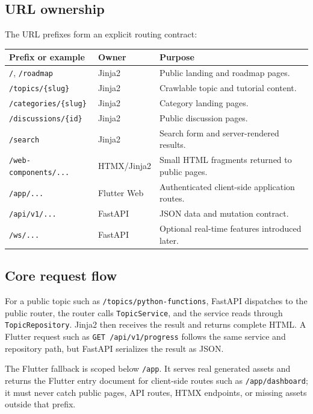 \documentclass[11pt,a4paper]{article}
\begin{document}
\subsection{URL ownership}

The URL prefixes form an explicit routing contract:

\begin{tabularx}{\linewidth}{@{}p{.29\linewidth}p{.22\linewidth}X@{}}
\toprule
\textbf{Prefix or example} & \textbf{Owner} & \textbf{Purpose}\\
\midrule
\texttt{/}, \texttt{/roadmap} & Jinja2 & Public landing and roadmap pages.\\
\texttt{/topics/\{slug\}} & Jinja2 & Crawlable topic and tutorial content.\\
\texttt{/categories/\{slug\}} & Jinja2 & Category landing pages.\\
\texttt{/discussions/\{id\}} & Jinja2 & Public discussion pages.\\
\texttt{/search} & Jinja2 & Search form and server-rendered results.\\
\texttt{/web-components/...} & HTMX/Jinja2 & Small HTML fragments returned to public pages.\\
\texttt{/app/...} & Flutter Web & Authenticated client-side application routes.\\
\texttt{/api/v1/...} & FastAPI & JSON data and mutation contract.\\
\texttt{/ws/...} & FastAPI & Optional real-time features introduced later.\\
\bottomrule
\end{tabularx}

\subsection{Core request flow}

For a public topic such as \texttt{/topics/python-functions}, FastAPI dispatches to
the public router, the router calls \texttt{TopicService}, and the service reads
through \texttt{TopicRepository}. Jinja2 then receives the result and returns
complete HTML. A Flutter request such as \texttt{GET /api/v1/progress} follows the
same service and repository path, but FastAPI serializes the result as JSON.

The Flutter fallback is scoped below \texttt{/app}. It serves real generated assets
and returns the Flutter entry document for client-side routes such as
\texttt{/app/dashboard}; it must never catch public pages, API routes, HTMX
endpoints, or missing assets outside that prefix.
\end{document}
